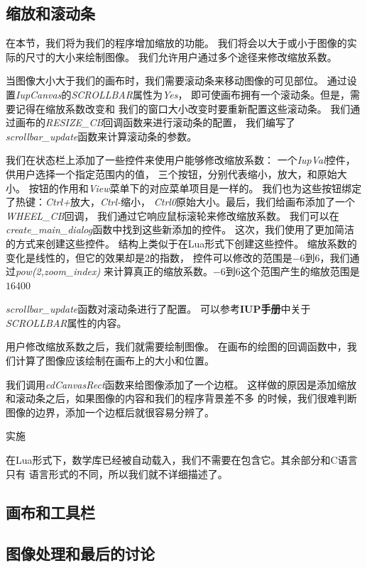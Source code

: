 \documentclass{ctexart}
\begin{document}
\subsection{缩放和滚动条}

在本节，我们将为我们的程序增加缩放的功能。
我们将会以大于或小于图像的实际的尺寸的大小来绘制图像。
我们允许用户通过多个途径来修改缩放系数。

当图像大小大于我们的画布时，我们需要滚动条来移动图像的可见部位。
通过设置\emph{IupCanvas}的\emph{SCROLLBAR}属性为\emph{Yes}，
即可使画布拥有一个滚动条。但是，需要记得在缩放系数改变和
我们的窗口大小改变时要重新配置这些滚动条。
我们通过画布的\emph{RESIZE\_CB}回调函数来进行滚动条的配置，
我们编写了\emph{scrollbar\_update}函数来计算滚动条的参数。

我们在状态栏上添加了一些控件来使用户能够修改缩放系数：
一个\emph{IupVal}控件，供用户选择一个指定范围内的值，
三个按钮，分别代表缩小，放大，和原始大小。
按钮的作用和\emph{View}菜单下的对应菜单项目是一样的。
我们也为这些按钮绑定了热键：\emph{Ctrl+}放大，\emph{Ctrl-}缩小，
\emph{Ctrl0}原始大小。最后，我们给画布添加了一个\emph{WHEEL\_CB}回调，
我们通过它响应鼠标滚轮来修改缩放系数。
我们可以在\emph{create\_main\_dialog}函数中找到这些新添加的控件。
这次，我们使用了更加简洁的方式来创建这些控件。
结构上类似于在Lua形式下创建这些控件。
缩放系数的变化是线性的，但它的效果却是2的指数，
控件可以修改的范围是$-6$到$6$，我们通过\emph{pow(2,zoom\_index)}
来计算真正的缩放系数。$-6$到$6$这个范围产生的缩放范围是$1%
$6400%

\emph{scrollbar\_update}函数对滚动条进行了配置。
可以参考\textbf{IUP手册}中关于\emph{SCROLLBAR}属性的内容。


用户修改缩放系数之后，我们就需要绘制图像。
在画布的绘图的回调函数中，我们计算了图像应该绘制在画布上的大小和位置。

我们调用\emph{cdCanvasRect}函数来给图像添加了一个边框。
这样做的原因是添加缩放和滚动条之后，如果图像的内容和我们的程序背景差不多
的时候，我们很难判断图像的边界，添加一个边框后就很容易分辨了。

实施

在Lua形式下，数学库已经被自动载入，我们不需要在包含它。其余部分和C语言只有
语言形式的不同，所以我们就不详细描述了。

\subsection{画布和工具栏}

\subsection{图像处理和最后的讨论}
\end{document}
